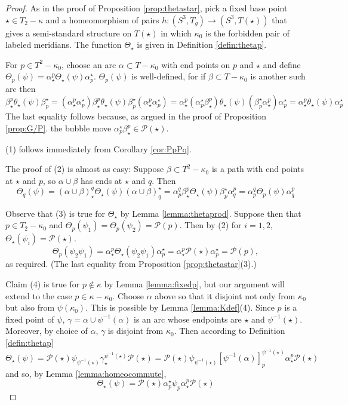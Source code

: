 \documentclass[12pt]{amsart}
\newcommand{\calP}{\mathcal P}
\begin{document}
\begin{proof} As in the proof of Proposition \ref{prop:thetastar}, pick a fixed base point $\star \in T_2 - \kappa$ and a homeomorphism of pairs $h:(S^3, T_g) \to (S^3, T(\star))$ that gives a semi-standard structure on $T(\star)$ in which $\kappa_0$ is the forbidden pair of labeled meridians.   The function $\Theta_{\star}$ is given in Definition \ref{defin:thetap}.  

For $p \in T^2 - \kappa_0$, choose an arc $\alpha \subset T - \kappa_0$ with end points on $p$ and $\star$ and define $\Theta_p(\psi) =  \alpha_{\star}^p \Theta_{\star}(\psi) \alpha_p^{\star}$.  $\Theta_p(\psi)$ is well-defined, for if $\beta \subset T - \kappa_0$ is another such arc then 
\[ \beta_{\star}^p \theta_{\star}(\psi) \beta_p^{\star} = (\alpha_{\star}^p\alpha^{\star}_p)\beta_{\star}^p \theta_{\star}(\psi) \beta_p^{\star}(\alpha_{\star}^p\alpha^{\star}_p) = \alpha_{\star}^p(\alpha^{\star}_p\beta_{\star}^p) \theta_{\star}(\psi)( \beta_p^{\star}\alpha_{\star}^p)\alpha^{\star}_p = \alpha_{\star}^p \theta_{\star}(\psi)\alpha^{\star}_p\]
The last equality follows because, as argued in the proof of Proposition \ref{prop:G/P}.  the bubble move $\alpha^{\star}_p\beta_{\star}^p \in \calP(\star)$.  

 (1) follows immediately from Corollary \ref{cor:PpPq}.  

The proof of (2) is almost as easy: Suppose $\beta \subset T^2 - \kappa_0$ is a path with end points at $\star$ and $p$, so $\alpha \cup \beta$ has ends at $\star$ and $q$.  Then 
\[ \Theta_q(\psi) = (\alpha \cup \beta)_{\star}^q \Theta_{\star}(\psi) (\alpha \cup \beta)^{\star}_q  =    \alpha_p^q \beta_{\star}^p \Theta_{\star}(\psi) \beta^{\star}_p \alpha_q^p  = \alpha_p^q \Theta_p(\psi) \alpha_q^p \]

Observe that (3) is true for $\Theta_{\star}$ by Lemma \ref{lemma:thetaprod}.  Suppose then that $p \in T_2 - \kappa_0$ and $\Theta_p(\psi_1) = \Theta_p(\psi_2) = \calP(p)$.  Then by (2)
for $i = 1, 2$, $\Theta_{\star}(\psi_i) = \calP(\star)$.  
\[\Theta_p(\psi_2\psi_1) =  \alpha_{\star}^p \Theta_{\star}(\psi_2 \psi_1) \alpha^{\star}_p = \alpha_{\star}^p \calP(\star) \alpha^{\star}_p  = \calP(p),\]
as required.  (The last equality from Proposition \ref{prop:thetastar}(3).)

Claim (4) is true for $p \notin \kappa$ by Lemma \ref{lemma:fixedp}, but our argument will extend to the case $p \in \kappa - \kappa_0$.  Choose $\alpha$ above so that it disjoint not only from $\kappa_0$ but also from $\psi(\kappa_0)$.  This is possible by Lemma \ref{lemma:Kdef}(4).  Since $p$ is a fixed point of $\psi$,  $\gamma = \alpha \cup \psi^{-1}(\alpha)$ is an arc whose endpoints are $\star$ and $\psi^{-1}(\star)$.  Moreover, by choice of $\alpha$, $\gamma$ is disjoint from $\kappa_0$.  Then according to Definition \ref{defin:thetap} 
\[\Theta_{\star}(\psi) = \calP(\star) \psi_{\psi^{-1}(\star)} \gamma_{\star}^{\psi^{-1}(\star)} \calP(\star) = \calP(\star) \psi_{\psi^{-1}(\star)} [\psi^{-1}(\alpha)]_p^{\psi^{-1}(\star)} \alpha_{\star}^p \calP(\star) \]
and so, by  Lemma \ref{lemma:homeocommute}, 
\[\Theta_{\star}(\psi) =  \calP(\star) \alpha_p^{\star} \psi_p \alpha_{\star}^p \calP(\star)  \] 


\end{proof}
\end{document}
